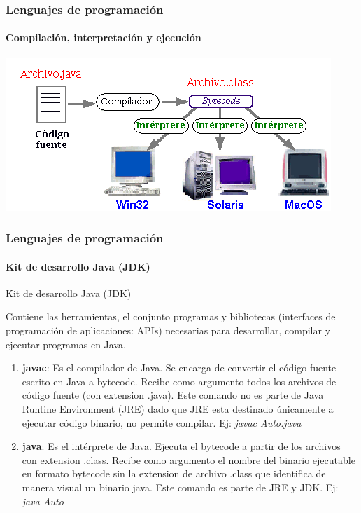 \documentclass{beamer}
\begin{document}
		\begin{frame}
			\frametitle{Lenguajes de programaci\'on}
			\framesubtitle{Compilaci\'on, interpretaci\'on y ejecuci\'on}

				\begin{center}
					\includegraphics[scale=.65]{images/funcionamiento_java.png}
				\end{center}
		\end{frame}

		\begin{frame}
			\frametitle{Lenguajes de programaci\'on}
			\framesubtitle{Kit de desarrollo Java (JDK)}

			\begin{exampleblock}{Kit de desarrollo Java (JDK)}
				{\scriptsize
				Contiene las herramientas, el conjunto programas y bibliotecas (interfaces de programaci\'on de aplicaciones: APIs) necesarias para desarrollar, compilar y ejecutar programas en Java. 
				\begin{enumerate}
					\item \textbf{javac}: Es el compilador de Java. Se encarga de convertir el c\'odigo fuente escrito en Java a bytecode. Recibe como argumento todos los archivos de c\'odigo fuente (con extension .java). Este comando no es parte de Java Runtine Environment (JRE) dado que JRE esta destinado \'unicamente a ejecutar c\'odigo binario, no permite compilar. Ej: \emph{javac Auto.java}
					\item \textbf{java}: Es el int\'erprete de Java. Ejecuta el bytecode a partir de los archivos con extension .class. Recibe como argumento el nombre del binario ejecutable en formato bytecode sin la extension de archivo .class que identifica de manera visual un binario java. Este comando es parte de JRE y JDK. Ej: \emph{java Auto}
				\end{enumerate}
				}
			\end{exampleblock}
		\end{frame}
\end{document}
